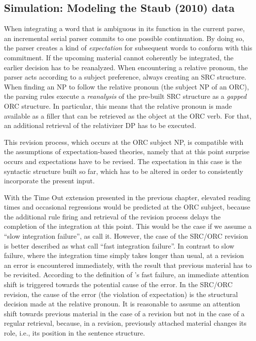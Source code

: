 \documentclass{cambridge7A}\usepackage[]{graphicx}\usepackage[]{color}
\begin{document}
\subsection{Simulation: Modeling the Staub (2010) data}
When integrating a word that is ambiguous in its function in the current parse, an incremental serial parser commits to one possible continuation. By doing so, the parser creates a kind of \emph{expectation} for subsequent words to conform with this commitment. If the upcoming material cannot coherently be integrated, the earlier decision has to be reanalyzed.
When encountering a relative pronoun, the \cite{LewisVasishth2005} parser acts according to a subject preference, always creating an SRC structure.
When finding an NP to follow the relative pronoun (the subject NP of an ORC), the parsing rules execute a \emph{reanalysis} of the pre-built  SRC structure as a \emph{gapped}  ORC structure. In particular, this means that the relative pronoun is made available as a filler that can be retrieved as the object at the ORC verb. For that, an additional retrieval of the relativizer DP has to be executed. 

This revision process, which occurs at the ORC subject NP, is compatible with the assumptions of expectation-based theories, namely that at this point surprise occurs and expectations have to be revised. The expectation in this case is the syntactic structure built so far, which has to be altered in order to consistently incorporate the present input.

With the Time Out extension presented in the previous chapter, elevated reading times and occasional regressions would be predicted at the ORC subject, because the additional rule firing and retrieval of the revision process delays the completion of the integration at this point. This would be the case if we assume a ``slow integration failure'', as \cite{ReichleWarrenMcConnell2009} call it. However, the case of the SRC/ORC revision is better described as what \cite{ReichleWarrenMcConnell2009} call ``fast integration failure''. In contrast to slow failure, where  the integration time simply takes longer than usual, at a revision an error is encountered immediately, with the result that previous material has to be revisited. 
According to the definition of \cite{ReichleWarrenMcConnell2009}'s fast failure, an immediate attention shift is triggered towards the potential cause of the error. In the SRC/ORC revision, the cause of the error (the violation of expectation) is the structural decision made at the relative pronoun.
It is reasonable to assume an attention shift towards previous material in the case of a revision but not in the case of a regular retrieval, because, in a revision, previously attached material changes its role, i.e., its position in the sentence structure. 
\end{document}
